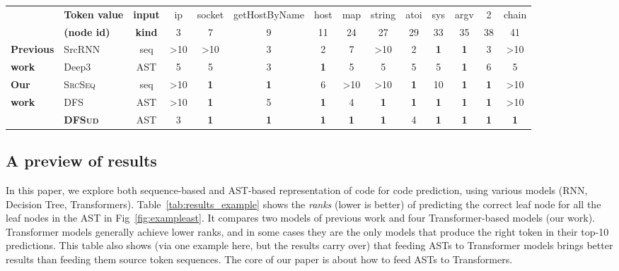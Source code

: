 \documentclass[nonacm, sigconf]{acmart}
\newcommand{\abbr}[1]{\textsc{#1}~}
\newcommand{\SrcSeq}{\abbr{SrcSeq}} \newcommand{\SrcRNN}{\abbr{SrcRNN}} \newcommand{\LeafSeq}{\abbr{LeafSeq}} \newcommand{\RootPath}{\abbr{RootPath}} \newcommand{\LeafTokens}{\abbr{LeafTokens}} \newcommand{\DFS}{\abbr{DFS}} \newcommand{\TreeRel}{\abbr{DFS{ud}}} \newcommand{\TreeReli}{\abbr{DFS{ud+}}}
\begin{document}
\begin{table*}[]
\begin{small}
    \centering
    \begin{tabular}{l|l|c|c|c|c|c|c|c|c|c|c|c|c}
    \multicolumn{1}{l|}{} & \textbf{Token value} & \textbf{input} & ip   & socket & getHostByName & host & map  & string & atoi & sys  & argv & 2    & chain \\
    \multicolumn{1}{l|}{} & \textbf{(node id)}   & \textbf{kind} & 3    & 7      & 9             & 11   & 24   & 27     & 29   & 33   & 35   & 38   & 41    \\ \hline
    \textbf{Previous}    & SrcRNN   & seq & >10 & >10 & 3   & 2   & 7   & >10 & 2   & \textbf{1}   & \textbf{1}   & 3   & >10   \\
    \textbf{work}        & Deep3    & AST & 5   & 5   & 3   & \textbf{1}   & 5   & 5   & 5   & 5   & \textbf{1}   & 6   & 5  \\ \hline
    \textbf{Our}        & \SrcSeq  & seq & >10	& \textbf{1}	  & \textbf{1}	& 6   & >10	& >10 & \textbf{1}	& 10  & \textbf{1}	& \textbf{1}	  & >10   \\
\textbf{work}        & \DFS     & AST & >10	& \textbf{1}	  & 5	& \textbf{1}	  & 4	& \textbf{1}	  & \textbf{1}	& \textbf{1}	  & \textbf{1}	& \textbf{1}	  & >10   \\
    \multicolumn{1}{l|}{} & \textbf{\TreeRel} 
                                    & AST & 3	& \textbf{1}	  & \textbf{1}	& \textbf{1}	  & \textbf{1}	& \textbf{1}	  & 4	& \textbf{1}	  & \textbf{1}	& \textbf{1}	  & \textbf{1}    
    \end{tabular}
\end{small}
    \caption{Ranks for the predictions for the leaf nodes listed in Fig~\ref{fig:exampleast}.  >10 means the model did not get the right answer in the top 10 results. \TreeRel is our most powerful model.}
    \label{tab:results_example}
\end{table*}


\subsection{A preview of results}
In this paper, we explore both sequence-based and AST-based representation of code for code prediction, using various models (RNN, Decision Tree, Transformers).   
Table~\ref{tab:results_example} shows the \textit{ranks} (lower is better) of predicting the correct leaf node for all the leaf nodes in the AST in Fig~\ref{fig:exampleast}. It compares two models of previous work and four Transformer-based models (our work). Transformer models generally achieve lower ranks, and in some cases they are the only models that produce the right token in their top-10 predictions. This table also shows (via one example here, but the results carry over) that feeding ASTs to Transformer models brings better results than feeding them source token sequences.  The core of our paper is about how to feed ASTs to Transformers.
 
\end{document}
